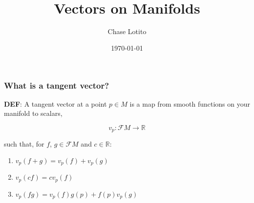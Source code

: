 \documentclass{beamer}
\title{Vectors on Manifolds}
\author{Chase Lotito}
\institute{Southern Illinois University Carbondale}
\date{\today}
\begin{document}
\frame{\titlepage}

\begin{frame}
    \frametitle{What is a tangent vector?}

    \textbf{DEF}: A tangent vector at a point \(p\in M\) is a map from smooth functions on your manifold to scalars,

    \begin{equation}
        v_p : \mathcal{F}M \to \mathbb{R}
    \end{equation}

    such that, for \(f\), \(g \in \mathcal{F}M\) and \(c \in \mathbb{R}\):

    \begin{enumerate}
        \item \(v_p(f+g)=v_p(f)+v_p(g)\)
        \item \(v_p(cf)=cv_p(f)\)
        \item \(v_p(fg)=v_p(f)g(p)+f(p)v_p(g)\)
    \end{enumerate}



\end{frame}
\end{document}

